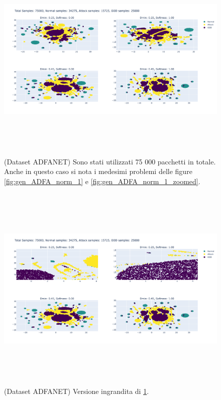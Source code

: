 \begin{figure}[htpb]
    \centering
    \includegraphics[width=\textwidth,height=10cm,keepaspectratio=true]{img/gen_test/adfa/ADFANET_normal_only_25k_ood.png}
    \caption{
      (Dataset ADFANET) Sono stati utilizzati 75 000 pacchetti in totale. Anche in questo caso si nota i medesimi problemi delle figure \ref{fig:gen_ADFA_norm_1} e \ref{fig:gen_ADFA_norm_1_zoomed}.
    }
    \label{fig:gen_ADFA_norm_2}
\end{figure}


\begin{figure}[htpb]
    \centering
    \includegraphics[width=\textwidth,height=10cm,keepaspectratio=true]{img/gen_test/adfa/ADFANET_normal_only_25k_ood_zoomed.png}
    \caption{
      (Dataset ADFANET) Versione ingrandita di \ref{fig:gen_ADFA_norm_2}.
    }
    \label{fig:gen_ADFA_norm_2_zoomed}
\end{figure}


